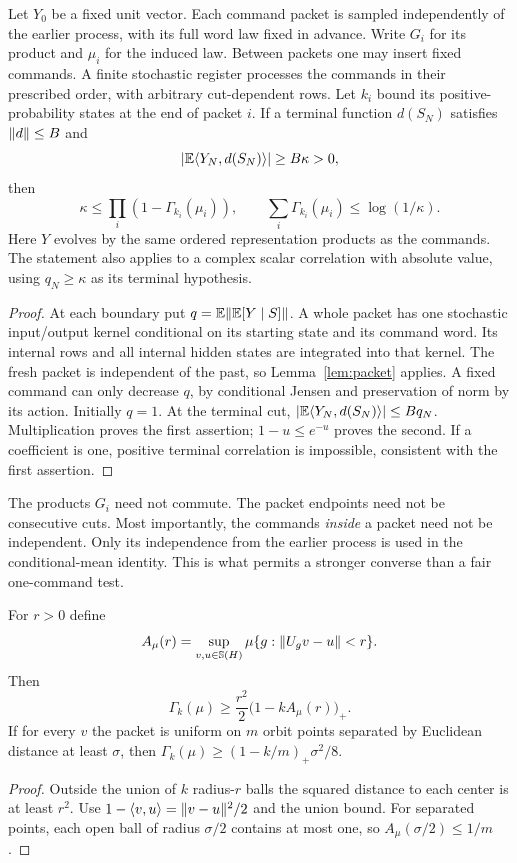 \begin{theorem}\label{thm:group-budget}
Let $Y_0$ be a fixed unit vector. Each command packet is sampled
independently of the earlier process, with its full word law fixed in
advance. Write $G_i$ for its product and $\mu_i$ for the induced law.
Between packets one may insert fixed commands. A finite stochastic register processes the
commands in their prescribed order, with arbitrary cut-dependent rows.
Let $k_i$ bound its positive-probability states at the end of packet $i$.
If a terminal function $d(S_N)$ satisfies $\lVert d\rVert\le B$ and
\[
             |\mathbb E\langle Y_N,d(S_N)\rangle|\ge B\kappa>0,
\]
then
\begin{equation}\label{eq:product-budget}
 \kappa\le\prod_i(1-\Gamma_{k_i}(\mu_i)),
 \qquad \sum_i\Gamma_{k_i}(\mu_i)\le\log(1/\kappa).
\end{equation}
Here $Y$ evolves by the same ordered representation products as the
commands. The statement also applies to a complex scalar correlation
with absolute value, using $q_N\ge\kappa$ as its terminal hypothesis.
\end{theorem}
\begin{proof}
At each boundary put $q=\mathbb E\lVert\mathbb E[Y\mid S]\rVert$. A whole packet has
one stochastic input/output kernel conditional on its starting state
and its command word. Its internal rows and all internal hidden states
are integrated into that kernel. The fresh packet is independent of the
past, so Lemma~\ref{lem:packet} applies. A fixed command can only decrease
$q$, by conditional Jensen and preservation of norm by its action.
Initially $q=1$. At the terminal cut,
$|\mathbb E\langle Y_N,d(S_N)\rangle|\le Bq_N$.
Multiplication proves the first assertion; $1-u\le e^{-u}$ proves
the second. If a coefficient is one, positive terminal correlation is
impossible, consistent with the first assertion.
\end{proof}

The products $G_i$ need not commute. The packet endpoints need not be
consecutive cuts. Most importantly, the commands \emph{inside} a packet
need not be independent. Only its independence from the earlier process
is used in the conditional-mean identity. This is what permits a stronger
converse than a fair one-command test.

\begin{proposition}\label{prop:small-ball}
For $r>0$ define
\[
 A_\mu(r)=\sup_{v,u\in\mathbb S(H)}
              \mu\{g:\lVert U_gv-u\rVert<r\}.
\]
Then
\begin{equation}\label{eq:smallball}
 \Gamma_k(\mu)\ge\frac{r^2}{2}\bigl(1-kA_\mu(r)\bigr)_+.
\end{equation}
If for every $v$ the packet is uniform on $m$ orbit points separated by
Euclidean distance at least $\sigma$, then
$\Gamma_k(\mu)\ge(1-k/m)_+\sigma^2/8$.
\end{proposition}
\begin{proof}
Outside the union of $k$ radius-$r$ balls the squared distance to each
center is at least $r^2$. Use
$1-\langle v,u\rangle=\lVert v-u\rVert^2/2$ and the union bound.
For separated points, each open ball of radius $\sigma/2$ contains at
most one, so $A_\mu(\sigma/2)\le1/m$.
\end{proof}
